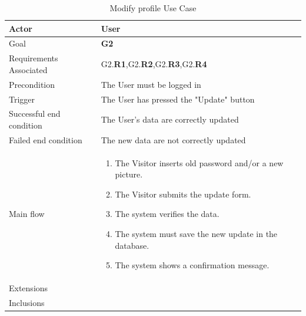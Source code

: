 \newline
\begin{table}[htb]
\begin{center}
\renewcommand{\arraystretch}{1.5}
\begin{tabular}{|l|p{}|}
\hline
Actor & User \\ \hline
Goal & \textbf{G2} \\ \hline
Requirements Associated & G2.\textbf{R1},G2.\textbf{R2},G2.\textbf{R3},G2.\textbf{R4} \\ \hline
Precondition & The User must be logged in \\ \hline
Trigger & The User has pressed the "Update" button \\ \hline
Successful end condition & The User's data are correctly updated \\ \hline
Failed end condition & The new data are not correctly updated \\ \hline
Main flow & \begin{minipage}[t]{0.6\textwidth}
\begin{enumerate}
\addtolength{\itemindent}{0.5cm}
\item The Visitor inserts old password and/or a new picture.
\item The Visitor submits the update form.
\item The system verifies the data.
\item The system must save the new update in the database.
\item The system shows a confirmation message.
\vspace{1,5mm}
\end{enumerate}
\end{minipage} \\ \hline
Extensions & \\ \hline
Inclusions &  \\ \hline
\end{tabular}
\caption{Modify profile Use Case}
\end{center}
\end{table}
\clearpage

